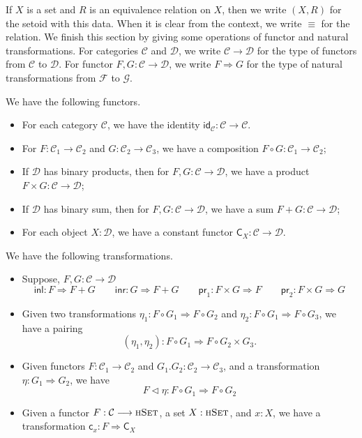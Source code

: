 \documentclass[9pt]{entcs}
\newcommand{\type}[1]{\textsc{#1}}
\newcommand{\functortxt}[1]{\mathsf{#1}}
\newcommand{\nattranstxt}[1]{\mathsf{#1}}
\newcommand{\hset}{\type{hSet}} %
\newcommand{\0}{\textbf{0}} %
\newcommand{\1}{\textbf{1}} %
\newcommand{\functor}[2]{#1 \longrightarrow #2} %
\newcommand{\idf}[1]{\functortxt{id}_{#1}} %
\newcommand{\Cf}[1]{\functortxt{C}_{#1}} %
\newcommand{\compf}[2]{#1 \circ #2} %
\newcommand{\prodf}[2]{#1 \times #2} %
\newcommand{\sumf}[2]{#1 + #2} %
\newcommand{\nattrans}[2]{#1 \Longrightarrow #2} %
\newcommand{\ctrans}[1]{\nattranstxt{c}_{#1}} %
\newcommand{\lwhisker}[2]{#1 \vartriangleleft #2} %
\newcommand{\inlt}{\nattranstxt{inl}} %
\newcommand{\inrt}{\nattranstxt{inr}} %
\newcommand{\prlt}{\nattranstxt{pr}_1} %
\newcommand{\prrt}{\nattranstxt{pr}_2} %
\newcommand{\pairt}[2]{(#1 , #2)} %
\begin{document}
If $X$ is a set and $R$ is an equivalence relation on $X$, then we write $(X, R)$ for the setoid with this data.
When it is clear from the context, we write $\equiv$ for the relation.
We finish this section by giving some operations of functor and natural transformations.
For categories $\mathcal{C}$ and $\mathcal{D}$, we write $\functor{\mathcal{C}}{\mathcal{D}}$ for the type of functors from $\mathcal{C}$ to $\mathcal{D}$.
For functor $F, G : \functor{\mathcal{C}}{\mathcal{D}}$, we write $\nattrans{F}{G}$ for the type of natural transformations from $\mathcal{F}$ to $\mathcal{G}$.

\begin{lemma}
\label{def:functor}
We have the following functors.
\begin{itemize}
	\item For each category $\mathcal{C}$, we have the identity $\idf{\mathcal{C}} : \functor{\mathcal{C}}{\mathcal{C}}$.
	\item For $F : \functor{\mathcal{C}_1}{\mathcal{C}_2}$ and $G : \functor{\mathcal{C}_2}{\mathcal{C}_3}$, we have a composition $\compf{F}{G} : \functor{\mathcal{C}_1}{\mathcal{C}_2}$;
	\item If $\mathcal{D}$ has binary products, then for $F, G : \functor{\mathcal{C}}{\mathcal{D}}$, we have a product $\prodf{F}{G} : \functor{\mathcal{C}}{\mathcal{D}}$;
	\item If $\mathcal{D}$ has binary sum, then for $F, G : \functor{\mathcal{C}}{\mathcal{D}}$, we have a sum $\sumf{F}{G} : \functor{\mathcal{C}}{\mathcal{D}}$;
	\item For each object $X : \mathcal{D}$, we have a constant functor $\Cf{X} : \functor{\mathcal{C}}{\mathcal{D}}$.
\end{itemize}
\end{lemma}

\begin{lemma}
\label{def:nattrans}
We have the following transformations.
\begin{itemize}
	\item Suppose, $F, G : \functor{\mathcal{C}}{\mathcal{D}}$
	\[
	\inlt : \nattrans{F}{\sumf{F}{G}}
	\quad \quad
	\inrt : \nattrans{G}{\sumf{F}{G}}
	\quad \quad
	\prlt : \nattrans{\prodf{F}{G}}{F}
	\quad \quad
	\prrt : \nattrans{\prodf{F}{G}}{G}
	\]
	\item Given two transformations $\eta_1 : \nattrans{\compf{F}{G_1}}{\compf{F}{G_2}}$ and $\eta_2 : \nattrans{\compf{F}{G_1}}{\compf{F}{G_3}}$, we have a pairing 
	\[
	\pairt{\eta_1}{\eta_2} : \nattrans{\compf{F}{G_1}}{\compf{F}{\prodf{G_2}{G_3}}}.
	\]
	\item Given functors $F : \functor{\mathcal{C}_1}{\mathcal{C}_2}$ and $G_1. G_2 : \functor{\mathcal{C}_2}{\mathcal{C}_3}$, and a transformation $\eta : \nattrans{G_1}{G_2}$, we have
	\[
	\lwhisker{F}{\eta} : \nattrans{\compf{F}{G_1}}{\compf{F}{G_2}}
	\]
	\item Given a functor $F : \functor{\mathcal{C}}{\hset}$, a set $X : \hset$, and $x : X$, we have a transformation $\ctrans{x} : \nattrans{F}{\Cf{X}}$
\end{itemize}
\end{lemma}
\end{document}
